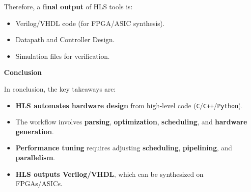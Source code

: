 \begin{itemize}
    Therefore, a \textbf{final output} of HLS tools is:
    \begin{itemize}
        \item Verilog/VHDL code (for FPGA/ASIC synthesis).
        \item Datapath and Controller Design.
        \item Simulation files for verification.
    \end{itemize}
\end{itemize}

\newpage

\begin{flushleft}
    \textcolor{Green3}{ \textbf{Conclusion}}
\end{flushleft}
In conclusion, the key takeaways are:
\begin{itemize}
    \item \textbf{HLS automates hardware design} from high-level code (\texttt{C}/\texttt{C++}/\texttt{Python}).
    \item The workflow involves \textbf{parsing}, \textbf{optimization}, \textbf{scheduling}, and \textbf{hardware generation}.
    \item \textbf{Performance tuning} requires adjusting \textbf{scheduling}, \textbf{pipelining}, and \textbf{parallelism}.
    \item \textbf{HLS outputs Verilog/VHDL}, which can be synthesized on FPGAs/ASICs.
\end{itemize}
